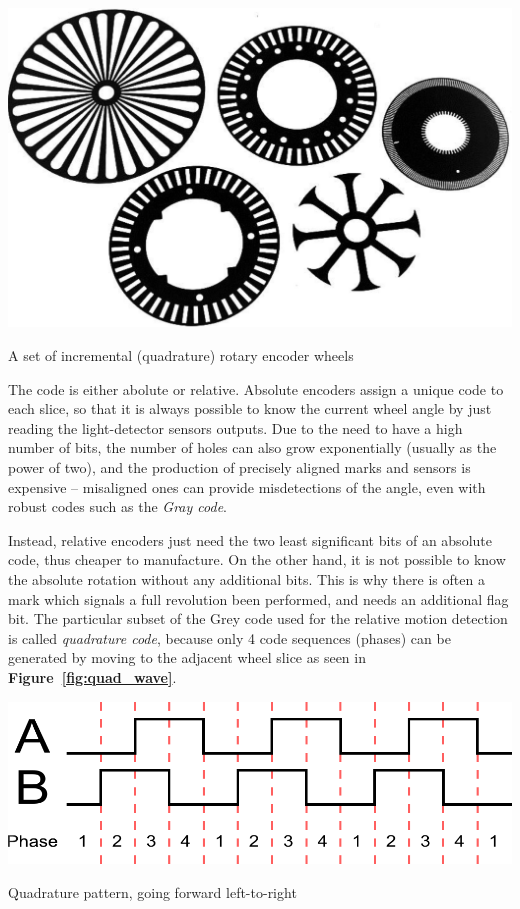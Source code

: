 \documentclass[a4paper,10pt]{article}
\makeatletter
\newenvironment{figurehere}{\def\@captype{figure}\vspace{2ex}}{\vspace{2ex}}
\makeatother
\begin{document}
\begin{multicols}{2}
\begin{figurehere}
	\label{fig:encoder_wheels}
	\centering
	\includegraphics[keepaspectratio=true,width=0.9\columnwidth]{images/encoder_wheels.pdf}
	\caption{A set of incremental (quadrature) rotary encoder wheels}
\end{figurehere}

The code is either abolute or relative. Absolute encoders assign a unique code
to each slice, so that it is always possible to know the current wheel angle
by just reading the light-detector sensors outputs. Due to the need to have a
high number of bits, the number of holes can also grow exponentially (usually
as the power of two), and the production of precisely aligned marks and
sensors is expensive -- misaligned ones can provide misdetections of the
angle, even with robust codes such as the \emph{Gray code}.

Instead, relative encoders just need the two least significant bits of an
absolute code, thus cheaper to manufacture. On the other hand, it is not
possible to know the absolute rotation without any additional bits. This is
why there is often a mark which signals a full revolution been performed, and
needs an additional flag bit. The particular subset of the Grey code used for
the relative motion detection is called \emph{quadrature code}, because only 4
code sequences (phases) can be generated by moving to the adjacent wheel slice
as seen in \textbf{Figure~\ref{fig:quad_wave}}.

\begin{figurehere}
	\label{fig:quad_wave}
	\centering
	\includegraphics[keepaspectratio=true,width=0.8\columnwidth]{images/quad_wave.pdf}
	\caption{Quadrature pattern, going forward left-to-right}
\end{figurehere}


\end{multicols}
\end{document}
